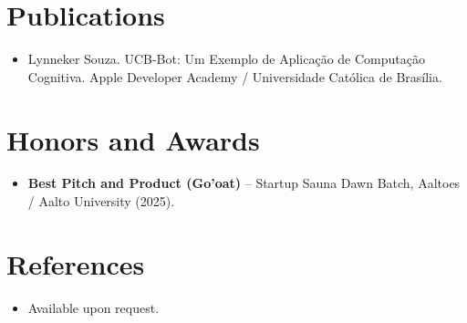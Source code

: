 \documentclass[11pt,a4paper,sans]{moderncv}
\begin{document}

\section{Publications}
\vspace{1pt}
\begin{itemize}
\item {Lynneker Souza. UCB-Bot: Um Exemplo de Aplicação de Computação Cognitiva. Apple Developer Academy / Universidade Católica de Brasília.}
\end{itemize}


\section{Honors and Awards}
\vspace{1pt}
\begin{itemize}
\item{\textbf{Best Pitch and Product (Go'oat)} -- Startup Sauna Dawn Batch, Aaltoes / Aalto University (2025).}
\end{itemize}


\section{References}
\vspace{1pt}
\begin{itemize}
\item{Available upon request.}
\end{itemize}
\end{document}
